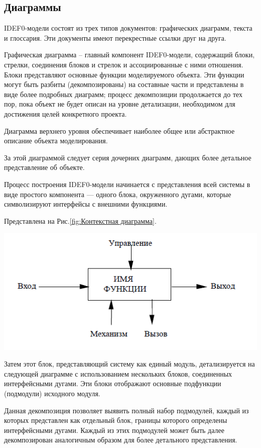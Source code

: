\documentclass[a4paper, final]{article}
\begin{document}
\subsection{Диаграммы}
\par IDEF0-модели состоят из трех типов документов: графических диаграмм, текста и глоссария. Эти документы имеют перекрестные ссылки друг на друга. 
\par Графическая диаграмма – главный компонент IDEF0-модели, содержащий блоки, стрелки, соединения блоков и стрелок и ассоциированные с ними отношения. Блоки представляют основные функции моделируемого объекта. Эти функции могут быть разбиты (декомпозированы) на составные части и представлены в виде более подробных диаграмм; процесс декомпозиции продолжается до тех пор, пока объект не будет описан на уровне детализации, необходимом для достижения целей конкретного проекта. 
\par Диаграмма верхнего уровня обеспечивает наиболее общее или абстрактное описание объекта моделирования. 
\par За этой диаграммой следует серия дочерних диаграмм, дающих более детальное представление об объекте.


\par Процесс построения IDEF0-модели начинается с представления всей системы в виде простого компонента — одного блока, окруженного дугами, которые символизируют интерфейсы с внешними функциями. 


Представлена на Рис.\ref{fig:Контекстная диаграмма}.
\begin{center}
	\includegraphics[scale=0.8]{context.png}
	\label{fig:Контекстная диаграмма}
\end{center}

\par Затем этот блок, представляющий систему как единый модуль, детализируется на следующей диаграмме с использованием нескольких блоков, соединенных интерфейсными дугами. Эти блоки отображают основные подфункции (подмодули) исходного модуля.
\par Данная декомпозиция позволяет выявить полный набор подмодулей, каждый из которых представлен как отдельный блок, границы которого определены интерфейсными дугами. Каждый из этих подмодулей может быть далее декомпозирован аналогичным образом для более детального представления.
\end{document}
